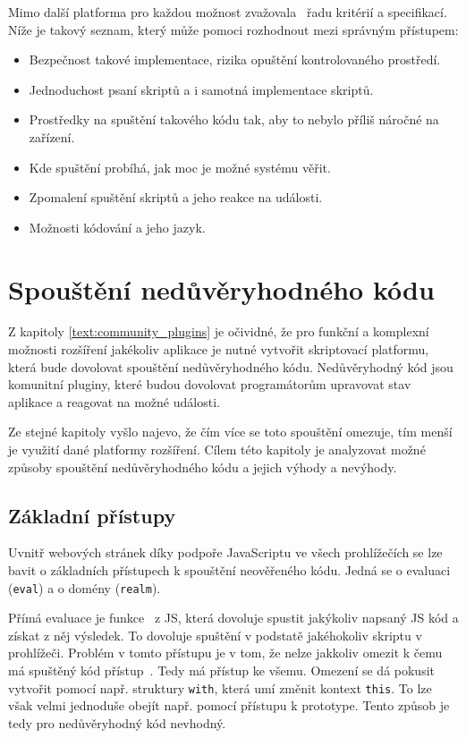 Mimo další platforma pro každou možnost zvažovala~\cite{figma_plugins_blog, figma_website} řadu kritérií a specifikací. 
Níže je takový seznam, který může pomoci rozhodnout mezi správným přístupem:

\begin{itemize}
    \item Bezpečnost takové implementace, rizika opuštění kontrolovaného prostředí.
    \item Jednoduchost psaní skriptů a i samotná implementace skriptů.
    \item Prostředky na spuštění takového kódu tak, aby to nebylo příliš náročné na zařízení.
    \item Kde spuštění probíhá, jak moc je možné systému věřit.
    \item Zpomalení spuštění skriptů a jeho reakce na události.
    \item Možnosti kódování a jeho jazyk.
\end{itemize}

\section{Spouštění nedůvěryhodného kódu}

Z kapitoly \ref{text:community_plugins} je očividné, že pro funkční a komplexní možnosti rozšíření jakékoliv aplikace je nutné vytvořit skriptovací platformu, která bude dovolovat spouštění nedůvěryhodného kódu.
Nedůvěryhodný kód jsou komunitní pluginy, které budou dovolovat programátorům upravovat stav aplikace a reagovat na možné události.

Ze stejné kapitoly vyšlo najevo, že čím více se toto spouštění omezuje, tím menší je využití dané platformy rozšíření.
Cílem této kapitoly je analyzovat možné způsoby spouštění nedůvěryhodného kódu a jejich výhody a nevýhody.

\subsection{Základní přístupy}

Uvnitř webových stránek díky podpoře JavaScriptu ve všech prohlížečích se lze bavit o základních přístupech k spouštění neověřeného kódu.
Jedná se o evaluaci (\texttt{eval}) a o domény (\texttt{realm}).

Přímá evaluace je funkce~\cite{eval} z JS, která dovoluje spustit jakýkoliv napsaný JS kód a získat z něj výsledek.
To dovoluje spuštění v podstatě jakéhokoliv skriptu v prohlížeči.
Problém v tomto přístupu je v tom, že nelze jakkoliv omezit k čemu má spuštěný kód přístup~\cite{eval, shadowrealms, figma_plugins_blog}.
Tedy má přístup ke všemu.
Omezení se dá pokusit vytvořit pomocí např. struktury \texttt{with}, která umí změnit kontext \texttt{this}.
To lze však velmi jednoduše obejít např. pomocí přístupu k prototype.
Tento způsob je tedy pro nedůvěryhodný kód nevhodný.

